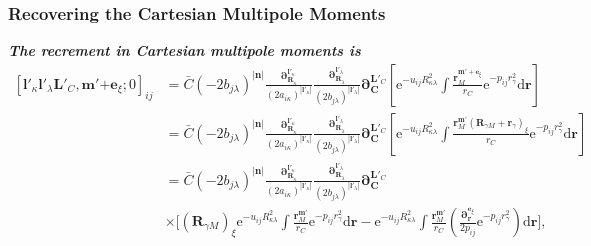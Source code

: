 \documentclass[a4paper,11pt,twoside,openright]{book}
\newcommand{\fixme}[1]{\textbf{\textit{\color{red} #1}}}
\begin{document}
\subsubsection{Recovering the Cartesian Multipole Moments}

\fixme{The recrement in Cartesian multipole moments is}
\begin{align}
  \left[\boldsymbol{l}'_{\kappa}\boldsymbol{l}'_{\lambda}\boldsymbol{L}'_{C},%
    \boldsymbol{m}'\mathrm{+}\boldsymbol{e}_{\xi};0\right]_{ij}
  &=\bar{C}(-2b_{j\lambda})^{|\boldsymbol{n}|}%
    \frac{\boldsymbol{\partial}_{\boldsymbol{R}_{\kappa}}^{\boldsymbol{l}'_{\kappa}}}%
      {(2a_{i\kappa})^{|\boldsymbol{l}'_{\kappa}|}}%
    \frac{\boldsymbol{\partial}_{\boldsymbol{R}_{\lambda}}^{\boldsymbol{l}'_{\lambda}}}%
      {(2b_{j\lambda})^{|\boldsymbol{l}'_{\lambda}|}}%
    \boldsymbol{\partial}_{\boldsymbol{C}}^{\boldsymbol{L}'_{C}}%
    \left[\mathrm{e}^{-u_{ij}R_{\kappa\lambda}^2}\int%
      \frac{\boldsymbol{r}_{M}^{\boldsymbol{m}'+\boldsymbol{e}_{\xi}}}{r_{C}}%
        \mathrm{e}^{-p_{ij}r_{\gamma}^2}\mathrm{d}\boldsymbol{r}\right]\\
  &=\bar{C}(-2b_{j\lambda})^{|\boldsymbol{n}|}%
    \frac{\boldsymbol{\partial}_{\boldsymbol{R}_{\kappa}}^{\boldsymbol{l}'_{\kappa}}}%
      {(2a_{i\kappa})^{|\boldsymbol{l}'_{\kappa}|}}%
    \frac{\boldsymbol{\partial}_{\boldsymbol{R}_{\lambda}}^{\boldsymbol{l}'_{\lambda}}}%
      {(2b_{j\lambda})^{|\boldsymbol{l}'_{\lambda}|}}%
    \boldsymbol{\partial}_{\boldsymbol{C}}^{\boldsymbol{L}'_{C}}%
    \left[\mathrm{e}^{-u_{ij}R_{\kappa\lambda}^2}\int%
      \frac{\boldsymbol{r}_{M}^{\boldsymbol{m}'}(\boldsymbol{R}_{\gamma M}+\boldsymbol{r}_{\gamma})_{\xi}}{r_{C}}%
        \mathrm{e}^{-p_{ij}r_{\gamma}^2}\mathrm{d}\boldsymbol{r}\right]\nonumber\\
  &=\bar{C}(-2b_{j\lambda})^{|\boldsymbol{n}|}%
    \frac{\boldsymbol{\partial}_{\boldsymbol{R}_{\kappa}}^{\boldsymbol{l}'_{\kappa}}}%
      {(2a_{i\kappa})^{|\boldsymbol{l}'_{\kappa}|}}%
    \frac{\boldsymbol{\partial}_{\boldsymbol{R}_{\lambda}}^{\boldsymbol{l}'_{\lambda}}}%
      {(2b_{j\lambda})^{|\boldsymbol{l}'_{\lambda}|}}%
    \boldsymbol{\partial}_{\boldsymbol{C}}^{\boldsymbol{L}'_{C}}\nonumber\\
  &\times\Biggl[(\boldsymbol{R}_{\gamma M})_{\xi}\mathrm{e}^{-u_{ij}R_{\kappa\lambda}^2}%
    \int\frac{\boldsymbol{r}_{M}^{\boldsymbol{m}'}}{r_{C}}%
    \mathrm{e}^{-p_{ij}r_{\gamma}^2}\mathrm{d}\boldsymbol{r}%
    -\mathrm{e}^{-u_{ij}R_{\kappa\lambda}^2}%
      \int\frac{\boldsymbol{r}_{M}^{\boldsymbol{m}'}}{r_{C}}%
      \left(\frac{\boldsymbol{\partial}_{\boldsymbol{r}}^{\boldsymbol{e}_{\xi}}}{2p_{ij}}
        \mathrm{e}^{-p_{ij}r_{\gamma}^2}\right)\mathrm{d}\boldsymbol{r}\Biggr],\nonumber
\end{align}
\end{document}

